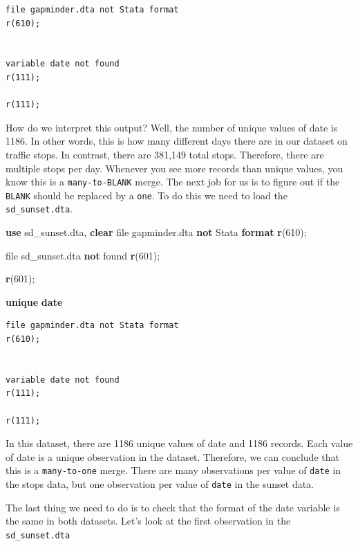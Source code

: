 \documentclass[
]{book}
\newenvironment{Shaded}{\begin{snugshade}}{\end{snugshade}}
\newcommand{\FunctionTok}[1]{\textcolor[rgb]{0.13,0.29,0.53}{\textbf{#1}}}
\newcommand{\KeywordTok}[1]{\textcolor[rgb]{0.13,0.29,0.53}{\textbf{#1}}}
\newcommand{\NormalTok}[1]{#1}
\begin{document}
\begin{verbatim}
file gapminder.dta not Stata format
r(610);


variable date not found
r(111);

r(111);
\end{verbatim}

How do we interpret this output? Well, the number of unique values of date is 1186. In other words, this is how many different days there are in our dataset on traffic stops. In contrast, there are 381,149 total stops. Therefore, there are multiple stops per day. Whenever you see more records than unique values, you know this is a \texttt{many-to-BLANK} merge. The next job for us is to figure out if the \texttt{BLANK} should be replaced by a \texttt{one}. To do this we need to load the \texttt{sd\_sunset.dta}.

\begin{Shaded}
\begin{Highlighting}[]
\KeywordTok{use}\NormalTok{ sd\_sunset.dta, }\KeywordTok{clear}
\NormalTok{file gapminder.dta }\KeywordTok{not}\NormalTok{ Stata }\KeywordTok{format}
\FunctionTok{r}\NormalTok{(610);}


\NormalTok{file sd\_sunset.dta }\KeywordTok{not}\NormalTok{ found}
\FunctionTok{r}\NormalTok{(601);}

\FunctionTok{r}\NormalTok{(601);}
\end{Highlighting}
\end{Shaded}

\begin{Shaded}
\begin{Highlighting}[]
\KeywordTok{unique} \FunctionTok{date}
\end{Highlighting}
\end{Shaded}

\begin{verbatim}
file gapminder.dta not Stata format
r(610);


variable date not found
r(111);

r(111);
\end{verbatim}

In this dataset, there are 1186 unique values of date and 1186 records. Each value of date is a unique observation in the dataset. Therefore, we can conclude that this is a \texttt{many-to-one} merge. There are many observations per value of \texttt{date} in the stops data, but one observation per value of \texttt{date} in the sunset data.

The last thing we need to do is to check that the format of the date variable is the same in both datasets. Let's look at the first observation in the \texttt{sd\_sunset.dta}
\end{document}

